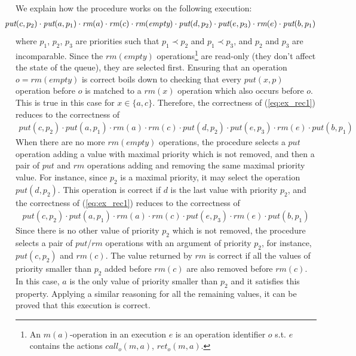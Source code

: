 We explain how the procedure works on the following execution:
\begin{align}
\hspace{-5mm}\textit{put}(c,p_2) \cdot \textit{put}(a,p_1) \cdot \textit{rm}(a) \cdot \textit{rm}(c) \cdot \textit{rm}(\textit{empty}) \cdot \textit{put}(d,p_2) \cdot \textit{put}(e,p_3) \cdot \textit{rm}(e) \cdot \textit{put}(b,p_1)\label{eq:ex_rec1}
\end{align}
where $p_1$, $p_2$, $p_3$ are priorities such that $p_1 \prec p_2$ and $p_1 \prec p_3$, and $p_2$ and $p_3$ are incomparable. Since the $\textit{rm}(\textit{empty})$ operations\footnote{An $m(a)$-operation in an execution $e$ is an operation identifier $o$ s.t. $e$ contains the actions $\textit{call}_o(m,a)$, $\textit{ret}_o(m,a)$.} are read-only (they don't affect the state of the queue), they are selected first. Ensuring that an operation $o=\textit{rm}(\textit{empty})$ is correct boils down to checking that every $\textit{put}(x,p)$ operation before $o$ is matched to a $\textit{rm}(x)$ operation which also occurs before $o$. This is true in this case for $x\in \{a,c\}$. Therefore, the correctness of (\ref{eq:ex_rec1}) reduces to the correctness of
\begin{align*}
\textit{put}(c,p_2) \cdot \textit{put}(a,p_1) \cdot \textit{rm}(a) \cdot \textit{rm}(c) \cdot \textit{put}(d,p_2) \cdot \textit{put}(e,p_3) \cdot \textit{rm}(e) \cdot \textit{put}(b,p_1)
\end{align*}
When there are no more $\textit{rm}(\textit{empty})$ operations, the procedure selects a $\textit{put}$ operation adding a value with maximal priority which is not removed, and then a pair of $\textit{put}$ and $\textit{rm}$ operations adding and removing the same maximal priority value. For instance, since $p_2$ is a maximal priority, it may select the operation $\textit{put}(d,p_2)$. {This operation is correct if $d$ is the last value with priority $p_2$, and the correctness of (\ref{eq:ex_rec1}) reduces to the correctness of
\begin{align*}
\textit{put}(c,p_2) \cdot \textit{put}(a,p_1) \cdot \textit{rm}(a) \cdot \textit{rm}(c) \cdot \textit{put}(e,p_3) \cdot \textit{rm}(e) \cdot \textit{put}(b,p_1)
\end{align*}
Since there is no other value of priority $p_2$ which is not removed, the procedure selects a pair of $\textit{put}$/$\textit{rm}$ operations with an argument of priority $p_2$,} for instance, $\textit{put}(c,p_2)$ and $\textit{rm}(c)$. The value returned by $\textit{rm}$ is correct if all the values of priority smaller than $p_2$ added before $\textit{rm}(c)$ are also removed before $\textit{rm}(c)$. In this case, $a$ is the only value of priority smaller than $p_2$ and it satisfies this property. Applying a similar reasoning for all the remaining values, it can be proved that this execution is correct.

